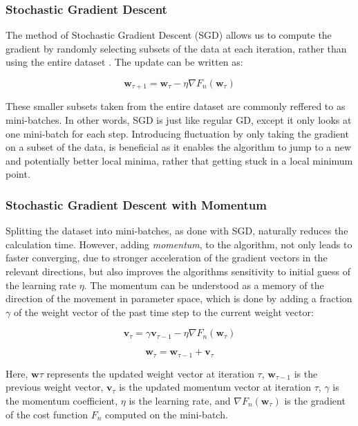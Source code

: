 \documentclass[a4paper, UKenglish, 11pt]{uiomaster}
\begin{document}
\subsubsection{Stochastic Gradient Descent}
The method of Stochastic Gradient Descent (SGD) allows us to compute the gradient by randomly selecting subsets of the data at each iteration, rather than using the entire dataset \cite{bishop2006pattern}. The update can be written as:

\begin{equation}
\textbf{w}_{\tau+1} = \textbf{w}_{\tau} - \eta\nabla F_n(\textbf{w}_\tau)
\end{equation}

These smaller subsets taken from the entire dataset are commonly reffered to as mini-batches. In other words, SGD is just like regular GD, except it only looks at one mini-batch for each step. Introducing fluctuation by only taking the gradient on a subset of the data, is beneficial as it enables the algorithm to jump to a new and potentially better local minima, rather that getting stuck in a local minimum point.

\subsubsection{Stochastic Gradient Descent with Momentum}
Splitting the dataset into mini-batches, as done with SGD, naturally reduces the calculation time. However, adding \emph{momentum}, to the algorithm, not only leads to faster converging, due to stronger acceleration of the gradient vectors in the relevant directions, but also improves the algorithms sensitivity to initial guess of the learning rate $\eta$. The momentum can be understood as a memory of the direction of the movement in parameter space, which is done by adding a fraction $\gamma$ of the weight vector of the past time step to the current weight vector:

\begin{equation}
\textbf{v}_{\tau} = \gamma\textbf{v}_{\tau-1} - \eta\nabla F_n(\textbf{w}_{\tau})
\end{equation}

\begin{equation}
\textbf{w}_{\tau} = \textbf{w}_{\tau-1} + \textbf{v}_{\tau}
\end{equation}

Here, $\textbf{w}{\tau}$ represents the updated weight vector at iteration $\tau$, $\textbf{w}_{\tau-1}$ is the previous weight vector, $\textbf{v}_{\tau}$ is the updated momentum vector at iteration $\tau$, $\gamma$ is the momentum coefficient, $\eta$ is the learning rate, and $\nabla F_n(\textbf{w}_{\tau})$ is the gradient of the cost function $F_n$ computed on the mini-batch.
\end{document}
